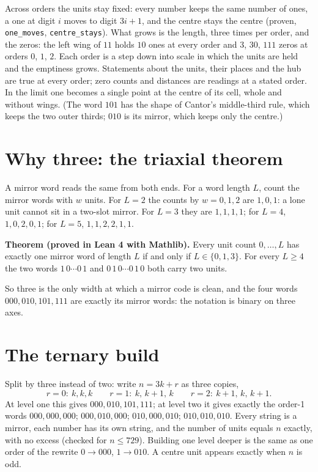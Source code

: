 \documentclass[11pt]{article}
\begin{document}
Across orders the units stay fixed: every number keeps the same number of ones, a one at digit $i$ moves to digit $3i+1$, and the centre stays the centre (proven, \texttt{one\_moves}, \texttt{centre\_stays}). What grows is the length, three times per order, and the zeros: the left wing of $11$ holds $10$ ones at every order and $3$, $30$, $111$ zeros at orders $0$, $1$, $2$. Each order is a step down into scale in which the units are held and the emptiness grows. Statements about the units, their places and the hub are true at every order; zero counts and distances are readings at a stated order. In the limit one becomes a single point at the centre of its cell, whole and without wings. (The word $101$ has the shape of Cantor's middle-third rule, which keeps the two outer thirds; $010$ is its mirror, which keeps only the centre.)

\section{Why three: the triaxial theorem}
A mirror word reads the same from both ends. For a word length $L$, count the mirror words with $w$ units. For $L=2$ the counts by $w = 0,1,2$ are $1,0,1$: a lone unit cannot sit in a two-slot mirror. For $L=3$ they are $1,1,1,1$; for $L=4$, $1,0,2,0,1$; for $L=5$, $1,1,2,2,1,1$.

\textbf{Theorem (proved in Lean 4 with Mathlib).} Every unit count $0,\dots,L$ has exactly one mirror word of length $L$ if and only if $L \in \{0, 1, 3\}$. For every $L\ge4$ the two words $1\,0\cdots0\,1$ and $0\,1\,0\cdots0\,1\,0$ both carry two units.

So three is the only width at which a mirror code is clean, and the four words $000, 010, 101, 111$ are exactly its mirror words: the notation is binary on three axes.

\section{The ternary build}
Split by three instead of two: write $n = 3k + r$ as three copies,
\[ r=0:\ k,k,k \qquad r=1:\ k,\,k{+}1,\,k \qquad r=2:\ k{+}1,\,k,\,k{+}1. \]
At level one this gives $000, 010, 101, 111$; at level two it gives exactly the order-1 words $000,000,000$; $000,010,000$; $010,000,010$; $010,010,010$. Every string is a mirror, each number has its own string, and the number of units equals $n$ exactly, with no excess (checked for $n\le 729$). Building one level deeper is the same as one order of the rewrite $0\to000$, $1\to010$. A centre unit appears exactly when $n$ is odd.
\end{document}
